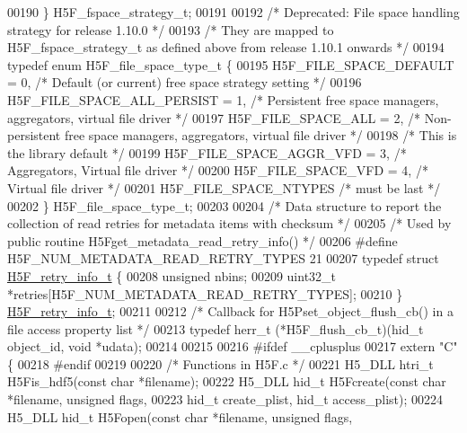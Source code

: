 \begin{DoxyCode}
00190 \} H5F\_fspace\_strategy\_t;
00191 
00192 \textcolor{comment}{/* Deprecated: File space handling strategy for release 1.10.0 */}
00193 \textcolor{comment}{/* They are mapped to H5F\_fspace\_strategy\_t as defined above from release 1.10.1 onwards */}
00194 \textcolor{keyword}{typedef} \textcolor{keyword}{enum} H5F\_file\_space\_type\_t \{
00195     H5F\_FILE\_SPACE\_DEFAULT = 0,     \textcolor{comment}{/* Default (or current) free space strategy setting */}
00196     H5F\_FILE\_SPACE\_ALL\_PERSIST = 1, \textcolor{comment}{/* Persistent free space managers, aggregators, virtual file driver */}
00197     H5F\_FILE\_SPACE\_ALL = 2,     \textcolor{comment}{/* Non-persistent free space managers, aggregators, virtual file driver */}
00198                     \textcolor{comment}{/* This is the library default */}
00199     H5F\_FILE\_SPACE\_AGGR\_VFD = 3,    \textcolor{comment}{/* Aggregators, Virtual file driver */}
00200     H5F\_FILE\_SPACE\_VFD = 4,     \textcolor{comment}{/* Virtual file driver */}
00201     H5F\_FILE\_SPACE\_NTYPES       \textcolor{comment}{/* must be last */}
00202 \} H5F\_file\_space\_type\_t;
00203 
00204 \textcolor{comment}{/* Data structure to report the collection of read retries for metadata items with checksum */}
00205 \textcolor{comment}{/* Used by public routine H5Fget\_metadata\_read\_retry\_info() */}
00206 \textcolor{preprocessor}{#define H5F\_NUM\_METADATA\_READ\_RETRY\_TYPES   21}
00207 \textcolor{keyword}{typedef} \textcolor{keyword}{struct }\hyperlink{struct_h5_f__retry__info__t}{H5F\_retry\_info\_t} \{
00208     \textcolor{keywordtype}{unsigned} nbins;
00209     uint32\_t *retries[H5F\_NUM\_METADATA\_READ\_RETRY\_TYPES];
00210 \} \hyperlink{struct_h5_f__retry__info__t}{H5F\_retry\_info\_t};
00211 
00212 \textcolor{comment}{/* Callback for H5Pset\_object\_flush\_cb() in a file access property list */}
00213 \textcolor{keyword}{typedef} herr\_t (*H5F\_flush\_cb\_t)(hid\_t object\_id, \textcolor{keywordtype}{void} *udata);
00214 
00215 
00216 \textcolor{preprocessor}{#ifdef \_\_cplusplus}
00217 \textcolor{keyword}{extern} \textcolor{stringliteral}{"C"} \{
00218 \textcolor{preprocessor}{#endif}
00219 
00220 \textcolor{comment}{/* Functions in H5F.c */}
00221 H5\_DLL htri\_t H5Fis\_hdf5(\textcolor{keyword}{const} \textcolor{keywordtype}{char} *filename);
00222 H5\_DLL hid\_t  H5Fcreate(\textcolor{keyword}{const} \textcolor{keywordtype}{char} *filename, \textcolor{keywordtype}{unsigned} flags,
00223               hid\_t create\_plist, hid\_t access\_plist);
00224 H5\_DLL hid\_t  H5Fopen(\textcolor{keyword}{const} \textcolor{keywordtype}{char} *filename, \textcolor{keywordtype}{unsigned} flags,

\end{DoxyCode}
